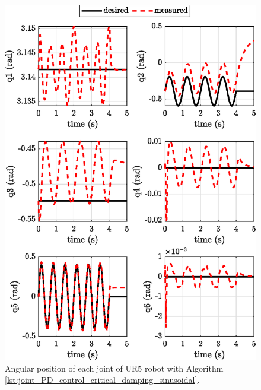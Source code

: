 \begin{figure}
    \centering
    \includegraphics{images/act_1.5_sin/joint_position.eps}
    \caption{Angular position of each joint of UR5 robot with Algorithm \ref{lst:joint_PD_control_critical_damping_sinusoidal}.}
    \label{fig:act_1.5_sin_joint_position}
\end{figure}

